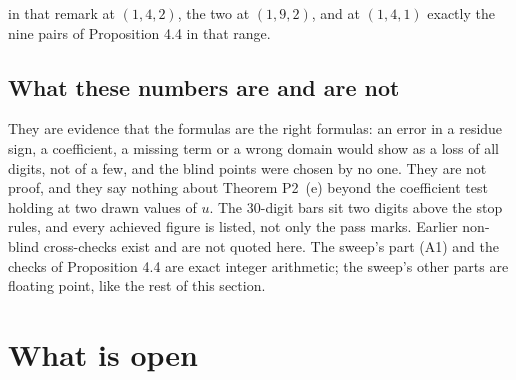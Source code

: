\documentclass[11pt]{article}
\begin{document}
in that remark at $(1,4,2)$, the two at $(1,9,2)$, and at $(1,4,1)$ exactly the nine pairs of Proposition 4.4 in that range.

\subsection{What these numbers are and are not}

They are evidence that the formulas are the right formulas: an error in a residue sign, a coefficient, a missing term or a wrong domain would show as a loss of all digits, not of a few, and the blind points were chosen by no one. They are not proof, and they say nothing about Theorem P2~(e) beyond the coefficient test holding at two drawn values of $u$. The 30-digit bars sit two digits above the stop rules, and every achieved figure is listed, not only the pass marks. Earlier non-blind cross-checks exist and are not quoted here. The sweep's part (A1) and the checks of Proposition 4.4 are exact integer arithmetic; the sweep's other parts are floating point, like the rest of this section.

\section{What is open}\label{sec:open}
\end{document}
